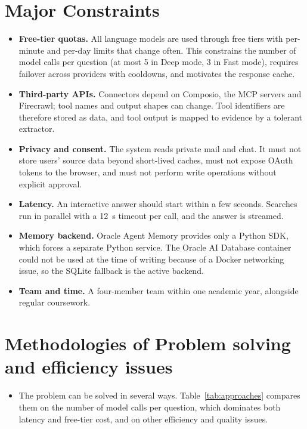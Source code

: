 \documentclass[oneside,a4paper,12pt]{report}
\begin{document}
\section{Major Constraints}
\begin{itemize}
\item \textbf{Free-tier quotas.} All language models are used through free tiers with per-minute and per-day limits that change often. This constrains the number of model calls per question (at most 5 in Deep mode, 3 in Fast mode), requires failover across providers with cooldowns, and motivates the response cache.
\item \textbf{Third-party APIs.} Connectors depend on Composio, the MCP servers and Firecrawl; tool names and output shapes can change. Tool identifiers are therefore stored as data, and tool output is mapped to evidence by a tolerant extractor.
\item \textbf{Privacy and consent.} The system reads private mail and chat. It must not store users' source data beyond short-lived caches, must not expose OAuth tokens to the browser, and must not perform write operations without explicit approval.
\item \textbf{Latency.} An interactive answer should start within a few seconds. Searches run in parallel with a 12~s timeout per call, and the answer is streamed.
\item \textbf{Memory backend.} Oracle Agent Memory provides only a Python SDK, which forces a separate Python service. The Oracle AI Database container could not be used at the time of writing because of a Docker networking issue, so the SQLite fallback is the active backend.
\item \textbf{Team and time.} A four-member team within one academic year, alongside regular coursework.
\end{itemize}

\section{Methodologies of Problem solving and efficiency issues}
\begin{itemize}
	\item The problem can be solved in several ways. Table~\ref{tab:approaches} compares them on the number of model calls per question, which dominates both latency and free-tier cost, and on other efficiency and quality issues.
\end{itemize}
\end{document}
